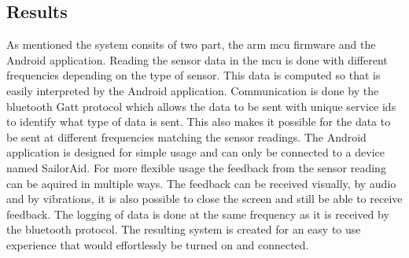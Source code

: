 \subsection{Results}
As mentioned the system consits of two part, the \gls{arm} \gls{mcu} firmware and the Android application. Reading the sensor data in the \gls{mcu} is done with different frequencies depending on the type of sensor. This data is computed so that is easily interpreted by the Android application. Communication is done by the bluetooth Gatt protocol which allows the data to be sent with unique service ids to identify what type of data is sent. This also makes it possible for the data to be sent at different frequencies matching the sensor readings. The Android application is designed for simple usage and can only be connected to a device named SailorAid. For more flexible usage the feedback from the sensor reading can be aquired in multiple ways. The feedback can be received visually, by audio and by vibrations, it is also possible to close the screen and still be able to receive feedback. The logging of data is done at the same frequency as it is received by the bluetooth protocol. The resulting system is created for an easy to use experience that would effortlessly be turned on and connected.
